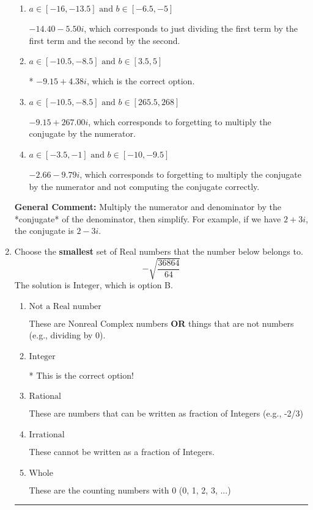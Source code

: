 \documentclass{extbook}[14pt]
\newcommand{\litem}[1]{\item #1

\rule{\textwidth}{0.4pt}}
\begin{document}
\begin{enumerate}
{\begin{enumerate}[label=\Alph*.]
 $-558.00  + 4.38 i$, which corresponds to forgetting to multiply the conjugate by the numerator and using a plus instead of a minus in the denominator.
\item \( a \in [-16, -13.5] \text{ and } b \in [-6.5, -5] \)

 $-14.40  - 5.50 i$, which corresponds to just dividing the first term by the first term and the second by the second.
\item \( a \in [-10.5, -8.5] \text{ and } b \in [3.5, 5] \)

* $-9.15  + 4.38 i$, which is the correct option.
\item \( a \in [-10.5, -8.5] \text{ and } b \in [265.5, 268] \)

 $-9.15  + 267.00 i$, which corresponds to forgetting to multiply the conjugate by the numerator.
\item \( a \in [-3.5, -1] \text{ and } b \in [-10, -9.5] \)

 $-2.66  - 9.79 i$, which corresponds to forgetting to multiply the conjugate by the numerator and not computing the conjugate correctly.
\end{enumerate}

\textbf{General Comment:} Multiply the numerator and denominator by the *conjugate* of the denominator, then simplify. For example, if we have $2+3i$, the conjugate is $2-3i$.
}
\litem{
Choose the \textbf{smallest} set of Real numbers that the number below belongs to.
\[ -\sqrt{\frac{36864}{64}} \]The solution is \( \text{Integer} \), which is option B.\begin{enumerate}[label=\Alph*.]
\item \( \text{Not a Real number} \)

These are Nonreal Complex numbers \textbf{OR} things that are not numbers (e.g., dividing by 0).
\item \( \text{Integer} \)

* This is the correct option!
\item \( \text{Rational} \)

These are numbers that can be written as fraction of Integers (e.g., -2/3)
\item \( \text{Irrational} \)

These cannot be written as a fraction of Integers.
\item \( \text{Whole} \)

These are the counting numbers with 0 (0, 1, 2, 3, ...)
\end{enumerate}

}
\end{enumerate}
\end{document}

